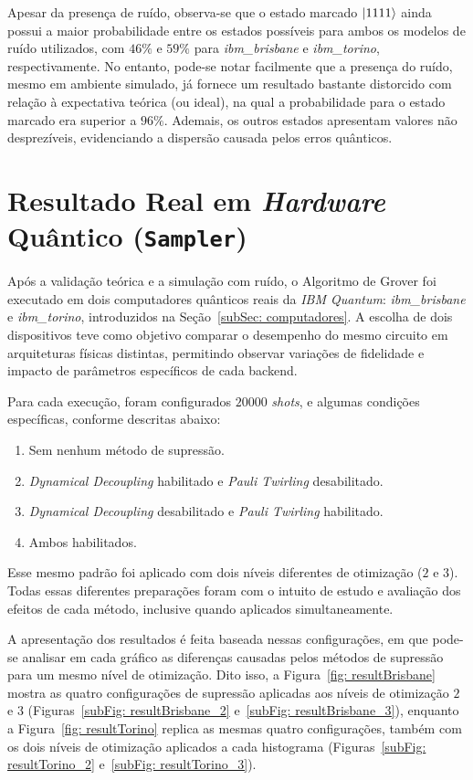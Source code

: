 Apesar da presença de ruído, observa-se que o estado marcado $\ket{1111}$ ainda possui a maior probabilidade entre os estados possíveis para ambos os modelos de ruído utilizados, com $46\%$ e $59\%$ para \textit{ibm\_brisbane} e \textit{ibm\_torino}, respectivamente. No entanto, pode-se notar facilmente que a presença do ruído, mesmo em ambiente simulado, já fornece um resultado bastante distorcido com relação à expectativa teórica (ou ideal), na qual a probabilidade para o estado marcado era superior a $96\%$. Ademais, os outros estados apresentam valores não desprezíveis, evidenciando a dispersão causada pelos erros quânticos.

\section{Resultado Real em \textit{Hardware} Quântico (\texttt{Sampler})}
\label{sec: resultReal}

Após a validação teórica e a simulação com ruído, o Algoritmo de Grover foi executado em dois computadores quânticos reais da \textit{IBM Quantum}: \textit{ibm\_brisbane} e \textit{ibm\_torino}, introduzidos na Seção~\ref{subSec: computadores}. A escolha de dois dispositivos teve como objetivo comparar o desempenho do mesmo circuito em arquiteturas físicas distintas, permitindo observar variações de fidelidade e impacto de parâmetros específicos de cada backend.

Para cada execução, foram configurados $20000$ \textit{shots}, e algumas condições específicas, conforme descritas abaixo:

\begin{enumerate}
    \item Sem nenhum método de supressão.
    \item \textit{Dynamical Decoupling} habilitado e \textit{Pauli Twirling} desabilitado.
    \item \textit{Dynamical Decoupling} desabilitado e \textit{Pauli Twirling} habilitado.
    \item Ambos habilitados.
\end{enumerate}

Esse mesmo padrão foi aplicado com dois níveis diferentes de otimização ($2$ e $3$). Todas essas diferentes preparações foram com o intuito de estudo e avaliação dos efeitos de cada método, inclusive quando aplicados simultaneamente.

A apresentação dos resultados é feita baseada nessas configurações, em que pode-se analisar em cada gráfico as diferenças causadas pelos métodos de supressão para um mesmo nível de otimização. Dito isso, a Figura~\ref{fig: resultBrisbane} mostra as quatro configurações de supressão aplicadas aos níveis de otimização $2$ e $3$ (Figuras~\ref{subFig: resultBrisbane_2} e~\ref{subFig: resultBrisbane_3}), enquanto a Figura~\ref{fig: resultTorino} replica as mesmas quatro configurações, também com os dois níveis de otimização aplicados a cada histograma (Figuras~\ref{subFig: resultTorino_2} e~\ref{subFig: resultTorino_3}). 

